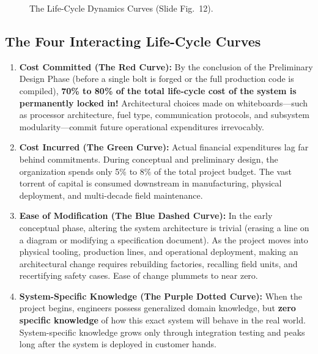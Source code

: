 \begin{figure}[htbp]
{%
}
\caption{The Life-Cycle Dynamics Curves (Slide Fig.~12).}
\label{fig:lifecycle_dynamics_curves}
\end{figure}

\subsection{The Four Interacting Life-Cycle Curves}
\begin{enumerate}[leftmargin=2em]
    \item \textbf{Cost Committed (The Red Curve):} By the conclusion of the Preliminary Design Phase (before a single bolt is forged or the full production code is compiled), \textbf{70\% to 80\% of the total life-cycle cost of the system is permanently locked in!} Architectural choices made on whiteboards—such as processor architecture, fuel type, communication protocols, and subsystem modularity—commit future operational expenditures irrevocably.
    \item \textbf{Cost Incurred (The Green Curve):} Actual financial expenditures lag far behind commitments. During conceptual and preliminary design, the organization spends only 5\% to 8\% of the total project budget. The vast torrent of capital is consumed downstream in manufacturing, physical deployment, and multi-decade field maintenance.
    \item \textbf{Ease of Modification (The Blue Dashed Curve):} In the early conceptual phase, altering the system architecture is trivial (erasing a line on a diagram or modifying a specification document). As the project moves into physical tooling, production lines, and operational deployment, making an architectural change requires rebuilding factories, recalling field units, and recertifying safety cases. Ease of change plummets to near zero.
    \item \textbf{System-Specific Knowledge (The Purple Dotted Curve):} When the project begins, engineers possess generalized domain knowledge, but \textbf{zero specific knowledge} of how this exact system will behave in the real world. System-specific knowledge grows only through integration testing and peaks long after the system is deployed in customer hands.
\end{enumerate}

